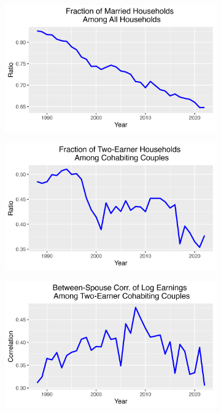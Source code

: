 \documentclass{article}
\begin{document}
\begin{figure}
\begin{subfigure}[t]{0.475\textwidth}
        \label{fig:Indi_to_HH_Var_single}
    \end{subfigure}
    \begin{subfigure}[t]{0.475\textwidth}
        \centering
        \includegraphics[width=\textwidth]{Fig_3/Fig_3d_married_ratio.png}
        \label{fig:Indi_to_HH_married_ratio}
    \end{subfigure}
    \begin{subfigure}[t]{0.475\textwidth}
        \centering
        \includegraphics[width=\textwidth]{Fig_3/Fig_3e_two_earner_ratio.png}
        \label{fig:Indi_to_HH_two_earner_ratio}
    \end{subfigure}
    \begin{subfigure}[t]{0.475\textwidth}
        \centering
        \includegraphics[width=\textwidth]{Fig_3/Fig_3f_correlation.png}

\end{subfigure}
\end{figure}
\end{document}
